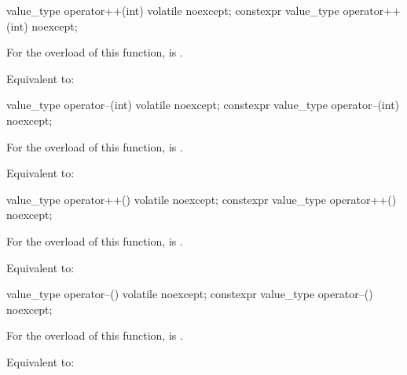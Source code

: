 %
%
\begin{itemdecl}
value_type operator++(int) volatile noexcept;
constexpr value_type operator++(int) noexcept;
\end{itemdecl}

\begin{itemdescr}
\pnum
\constraints
For the  overload of this function,
 is .

\pnum
\effects
Equivalent to: 
\end{itemdescr}

%
%
\begin{itemdecl}
value_type operator--(int) volatile noexcept;
constexpr value_type operator--(int) noexcept;
\end{itemdecl}

\begin{itemdescr}
\pnum
\constraints
For the  overload of this function,
 is .

\pnum
\effects
Equivalent to: 
\end{itemdescr}

%
%
\begin{itemdecl}
value_type operator++() volatile noexcept;
constexpr value_type operator++() noexcept;
\end{itemdecl}

\begin{itemdescr}
\pnum
\constraints
For the  overload of this function,
 is .

\pnum
\effects
Equivalent to: 
\end{itemdescr}

%
%
\begin{itemdecl}
value_type operator--() volatile noexcept;
constexpr value_type operator--() noexcept;
\end{itemdecl}

\begin{itemdescr}
\pnum
\constraints
For the  overload of this function,
 is .

\pnum
\effects
Equivalent to: 
\end{itemdescr}


